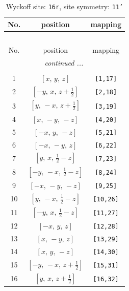 \documentclass[fleqn,8pt]{jsarticle}
\begin{document}
\begin{longtable}{ccc}
\caption{Wyckoff site: {\tt 16r}, site symmetry: {\tt 11'}}
 \\
 \hline \hline
No. & position & mapping \\ \hline \endfirsthead

\multicolumn{2}{l}{\tablename\ \thetable{}} \\
 \hline \hline
No. & position & mapping \\ \hline \endhead

 \hline \hline
\multicolumn{2}{r}{\footnotesize\it continued ...} \\ \endfoot

 \hline \hline
\multicolumn{2}{r}{} \\ \endlastfoot

1 & $\left[ x,\, y,\, z \right]$ & {\tt [1,17]} \\ \hline
2 & $\left[ - y,\, x,\, z + \frac{1}{2} \right]$ & {\tt [2,18]} \\ \hline
3 & $\left[ y,\, - x,\, z + \frac{1}{2} \right]$ & {\tt [3,19]} \\ \hline
4 & $\left[ x,\, - y,\, - z \right]$ & {\tt [4,20]} \\ \hline
5 & $\left[ - x,\, y,\, - z \right]$ & {\tt [5,21]} \\ \hline
6 & $\left[ - x,\, - y,\, z \right]$ & {\tt [6,22]} \\ \hline
7 & $\left[ y,\, x,\, \frac{1}{2} - z \right]$ & {\tt [7,23]} \\ \hline
8 & $\left[ - y,\, - x,\, \frac{1}{2} - z \right]$ & {\tt [8,24]} \\ \hline
9 & $\left[ - x,\, - y,\, - z \right]$ & {\tt [9,25]} \\ \hline
10 & $\left[ y,\, - x,\, \frac{1}{2} - z \right]$ & {\tt [10,26]} \\ \hline
11 & $\left[ - y,\, x,\, \frac{1}{2} - z \right]$ & {\tt [11,27]} \\ \hline
12 & $\left[ - x,\, y,\, z \right]$ & {\tt [12,28]} \\ \hline
13 & $\left[ x,\, - y,\, z \right]$ & {\tt [13,29]} \\ \hline
14 & $\left[ x,\, y,\, - z \right]$ & {\tt [14,30]} \\ \hline
15 & $\left[ - y,\, - x,\, z + \frac{1}{2} \right]$ & {\tt [15,31]} \\ \hline
16 & $\left[ y,\, x,\, z + \frac{1}{2} \right]$ & {\tt [16,32]} \\
\end{longtable}
\end{document}
